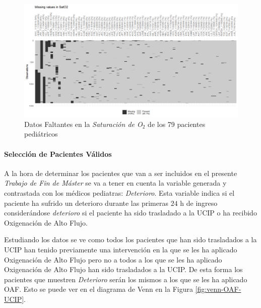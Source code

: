 \begin{landscape}

    \begin{figure}[H]
        \centering
        \includegraphics[scale = 0.9]{./img/missing-data-SatO2.png}
        \caption{Datos Faltantes en la \textit{Saturación de O$_2$} de los 79 pacientes pediátricos}
        \label{fig:missing-SatO2}
    \end{figure}
    
\end{landscape}
\restoregeometry 

\paragraph{Selección de Pacientes Válidos}\label{sec:seleccion_pacientes}

 A la hora de determinar los pacientes que van a ser incluidos en el presente \textit{Trabajo de Fin de Máster} se va a tener en cuenta la variable generada y contrastada con los médicos pediatras: \textit{Deterioro}. Esta variable indica si el paciente ha sufrido un deterioro durante las primeras $24$ h de ingreso considerándose \textit{deterioro} si el paciente ha sido trasladado a la UCIP o ha recibido Oxigenación de Alto Flujo. 

 Estudiando los datos se ve como todos los pacientes que han sido trasladados a la UCIP han tenido previamente una intervención en la que se les ha aplicado Oxigenación de Alto Flujo pero no a todos a los que se les ha aplicado Oxigenación de Alto Flujo han sido trasladados a la UCIP. De esta forma los pacientes que muestren \textit{Deterioro} serán los mismos a los que se les ha aplicado OAF. Esto se puede ver en el diagrama de Venn en la Figura \ref{fig:venn-OAF-UCIP}.

